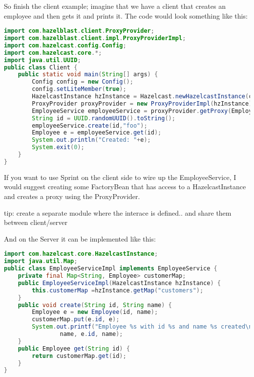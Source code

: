 So finish the client example; imagine that we have a client that creates an employee and then gets it and prints it. The code would look something like this:
\begin{lstlisting}[language=java]
import com.hazelblast.client.ProxyProvider;
import com.hazelblast.client.impl.ProxyProviderImpl;
import com.hazelcast.config.Config;
import com.hazelcast.core.*;
import java.util.UUID;
public class Client {
    public static void main(String[] args) {
        Config config = new Config();
        config.setLiteMember(true);
        HazelcastInstance hzInstance = Hazelcast.newHazelcastInstance(config);
        ProxyProvider proxyProvider = new ProxyProviderImpl(hzInstance);
        EmployeeService employeeService = proxyProvider.getProxy(EmployeeService.class);
        String id = UUID.randomUUID().toString();
        employeeService.create(id,"foo");
        Employee e = employeeService.get(id);
        System.out.println("Created: "+e);
        System.exit(0);
    }
}
\end{lstlisting}
If you want to use Sprint on the client side to wire up the EmployeeService, I would suggest creating some FactoryBean that has access to a HazelcastInstance and creates a proxy using the ProxyProvider.

tip: create a separate module where the interace is defined.. and share them between client/server

And on the Server it can be implemented like this:
\begin{lstlisting}[language=java]
import com.hazelcast.core.HazelcastInstance;
import java.util.Map;
public class EmployeeServiceImpl implements EmployeeService {
    private final Map<String, Employee> customerMap;
    public EmployeeServiceImpl(HazelcastInstance hzInstance) {
        this.customerMap =hzInstance.getMap("customers");
    }
    public void create(String id, String name) {
        Employee e = new Employee(id, name);
        customerMap.put(e.id, e);
        System.out.printf("Employee %s with id %s and name %s created\n",
                name, e.id, name);
    }
    public Employee get(String id) {
        return customerMap.get(id);
    }
}
\end{lstlisting}

